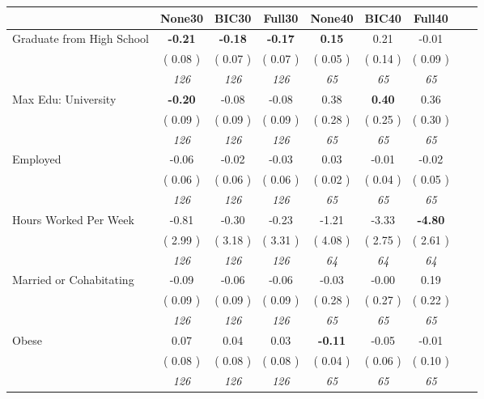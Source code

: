 \begin{tabular}{l c c c c c c c c}
\toprule
 & None30 & BIC30 & Full30 & None40 & BIC40 & Full40 \\
\midrule
Graduate from High School & \textbf{     -0.21 } & \textbf{     -0.18 } & \textbf{     -0.17 } & \textbf{      0.15 } &      0.21 &     -0.01 \\
& (     0.08 ) & (     0.07 ) & (     0.07 ) & (     0.05 ) & (     0.14 ) & (     0.09 ) \\
& \textit{ 126 } & \textit{ 126 } & \textit{ 126 } & \textit{ 65 } & \textit{ 65 } & \textit{ 65 } \\
Max Edu: University & \textbf{     -0.20 } &     -0.08 &     -0.08 &      0.38 & \textbf{      0.40 } &      0.36 \\
& (     0.09 ) & (     0.09 ) & (     0.09 ) & (     0.28 ) & (     0.25 ) & (     0.30 ) \\
& \textit{ 126 } & \textit{ 126 } & \textit{ 126 } & \textit{ 65 } & \textit{ 65 } & \textit{ 65 } \\
Employed &     -0.06 &     -0.02 &     -0.03 &      0.03 &     -0.01 &     -0.02 \\
& (     0.06 ) & (     0.06 ) & (     0.06 ) & (     0.02 ) & (     0.04 ) & (     0.05 ) \\
& \textit{ 126 } & \textit{ 126 } & \textit{ 126 } & \textit{ 65 } & \textit{ 65 } & \textit{ 65 } \\
Hours Worked Per Week &     -0.81 &     -0.30 &     -0.23 &     -1.21 &     -3.33 & \textbf{     -4.80 } \\
& (     2.99 ) & (     3.18 ) & (     3.31 ) & (     4.08 ) & (     2.75 ) & (     2.61 ) \\
& \textit{ 126 } & \textit{ 126 } & \textit{ 126 } & \textit{ 64 } & \textit{ 64 } & \textit{ 64 } \\
Married or Cohabitating &     -0.09 &     -0.06 &     -0.06 &     -0.03 &     -0.00 &      0.19 \\
& (     0.09 ) & (     0.09 ) & (     0.09 ) & (     0.28 ) & (     0.27 ) & (     0.22 ) \\
& \textit{ 126 } & \textit{ 126 } & \textit{ 126 } & \textit{ 65 } & \textit{ 65 } & \textit{ 65 } \\
Obese &      0.07 &      0.04 &      0.03 & \textbf{     -0.11 } &     -0.05 &     -0.01 \\
& (     0.08 ) & (     0.08 ) & (     0.08 ) & (     0.04 ) & (     0.06 ) & (     0.10 ) \\
& \textit{ 126 } & \textit{ 126 } & \textit{ 126 } & \textit{ 65 } & \textit{ 65 } & \textit{ 65 } \\

\end{tabular}
